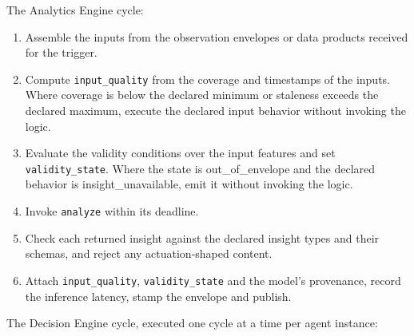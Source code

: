 The Analytics Engine cycle:

\begin{enumerate}
\def\labelenumi{\arabic{enumi}.}
\tightlist
\item
  Assemble the inputs from the observation envelopes or data products
  received for the trigger.
\item
  Compute \texttt{input\_\allowbreak{}quality} from the coverage and timestamps of
  the inputs. Where coverage is below the declared minimum or staleness
  exceeds the declared maximum, execute the declared input behavior
  without invoking the logic.
\item
  Evaluate the validity conditions over the input features and set
  \texttt{validity\_\allowbreak{}state}. Where the state is
  out\_\allowbreak{}of\_\allowbreak{}envelope and the declared behavior
  is insight\_\allowbreak{}unavailable, emit it without invoking the
  logic.
\item
  Invoke \texttt{analyze} within its deadline.
\item
  Check each returned insight against the declared insight types and
  their schemas, and reject any actuation-shaped content.
\item
  Attach \texttt{input\_\allowbreak{}quality}, \texttt{validity\_\allowbreak{}state} and the
  model's provenance, record the inference latency, stamp the envelope
  and publish.
\end{enumerate}

The Decision Engine cycle, executed one cycle at a time per agent
instance:

